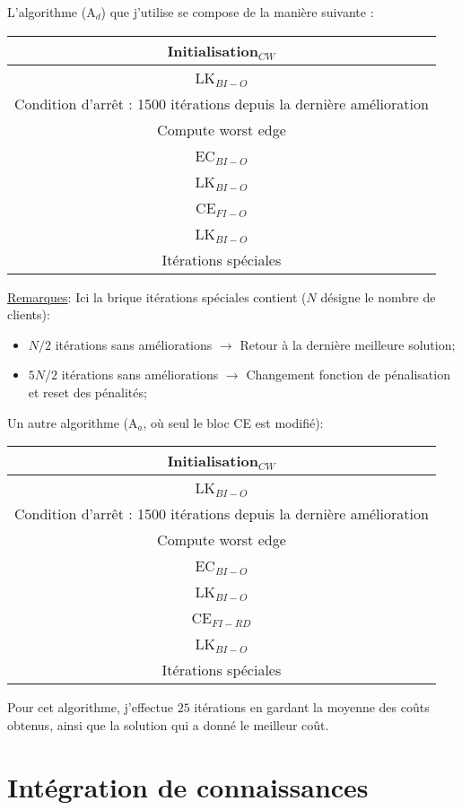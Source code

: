 \documentclass[a4paper,11pt]{article}%
\begin{document}
L'algorithme (A$_d$) que j'utilise se compose de la manière suivante :

\begin{center}
\begin{tabular}{|c|}

   \hline
   Initialisation$_{CW}$  \\
   \hline
   LK$_{BI-O}$ \\
   \hline
   \hline
   Condition d'arrêt : 1500 itérations depuis la dernière amélioration  \\
   \hline
   Compute worst edge \\
   \hline
   EC$_{BI-O}$ \\
   \hline
   LK$_{BI-O}$ \\
   \hline
   CE$_{FI-O}$ \\
   \hline
   LK$_{BI-O}$ \\
   \hline
   Itérations spéciales \\
   \hline
   \hline
   
\end{tabular}
\end{center}

\underline{Remarques}: Ici la brique itérations spéciales contient ($N$ désigne le nombre de clients):
\begin{itemize}
\item $N/2$ itérations sans améliorations $\rightarrow$ Retour à la dernière meilleure solution;
\item $5N/2$ itérations sans améliorations $\rightarrow$ Changement fonction de pénalisation et reset des pénalités;
\end{itemize} 


Un autre algorithme (A$_a$, où seul le bloc CE est modifié):
\begin{center}
\begin{tabular}{|c|}

   \hline
   Initialisation$_{CW}$  \\
   \hline
   LK$_{BI-O}$ \\
   \hline
   \hline
   Condition d'arrêt : 1500 itérations depuis la dernière amélioration  \\
   \hline
   Compute worst edge \\
   \hline
   EC$_{BI-O}$ \\
   \hline
   LK$_{BI-O}$ \\
   \hline
   CE$_{FI-RD}$ \\
   \hline
   LK$_{BI-O}$ \\
   \hline
   Itérations spéciales \\
   \hline
   \hline
   
\end{tabular}
\end{center}

Pour cet algorithme, j'effectue $25$ itérations en gardant la moyenne des coûts obtenus, ainsi que la solution qui a donné le meilleur coût.

\section{Intégration de connaissances}




\end{document}
